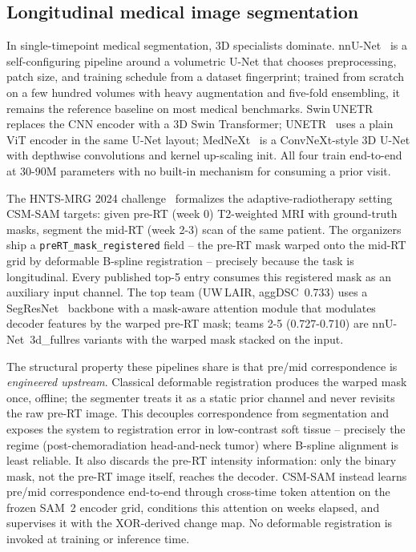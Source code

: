 \subsection{Longitudinal medical image segmentation}
\label{sec:related:longi}

In single-timepoint medical segmentation, 3D specialists dominate.
nnU-Net~\cite{isensee2021nnunet} is a self-configuring pipeline
around a volumetric U-Net that chooses preprocessing, patch size, and
training schedule from a dataset fingerprint; trained from scratch on
a few hundred volumes with heavy augmentation and five-fold
ensembling, it remains the reference baseline on most medical
benchmarks. Swin\,UNETR~\cite{hatamizadeh2021swinunetr} replaces the
CNN encoder with a 3D Swin Transformer;
UNETR~\cite{hatamizadeh2022unetr} uses a plain ViT encoder in the
same U-Net layout; MedNeXt~\cite{roy2023mednext} is a ConvNeXt-style
3D U-Net with depthwise convolutions and kernel up-scaling init. All
four train end-to-end at 30-90M parameters with no built-in mechanism
for consuming a prior visit.

The HNTS-MRG 2024 challenge~\cite{wahid2024hntsmrg} formalizes the
adaptive-radiotherapy setting CSM-SAM targets: given pre-RT (week 0)
T2-weighted MRI with ground-truth masks, segment the mid-RT
(week 2-3) scan of the same patient. The organizers ship a
\texttt{preRT\_mask\_registered} field -- the pre-RT mask warped onto
the mid-RT grid by deformable B-spline registration -- precisely
because the task is longitudinal. Every published top-5 entry
consumes this registered mask as an auxiliary input channel. The top
team (UW\,LAIR, aggDSC~0.733) uses a
SegResNet~\cite{myronenko2019segresnet} backbone with a mask-aware
attention module that modulates decoder features by the warped pre-RT
mask; teams 2-5 (0.727-0.710) are nnU-Net~3d\_fullres variants with
the warped mask stacked on the input.

The structural property these pipelines share is that pre/mid
correspondence is \emph{engineered upstream}. Classical deformable
registration produces the warped mask once, offline; the segmenter
treats it as a static prior channel and never revisits the raw pre-RT
image. This decouples correspondence from segmentation and exposes
the system to registration error in low-contrast soft tissue --
precisely the regime (post-chemoradiation head-and-neck tumor) where
B-spline alignment is least reliable. It also discards the pre-RT
intensity information: only the binary mask, not the pre-RT image
itself, reaches the decoder. CSM-SAM instead learns pre/mid
correspondence end-to-end through cross-time token attention on the
frozen SAM~2 encoder grid, conditions this attention on weeks elapsed,
and supervises it with the XOR-derived change map. No deformable
registration is invoked at training or inference time.

